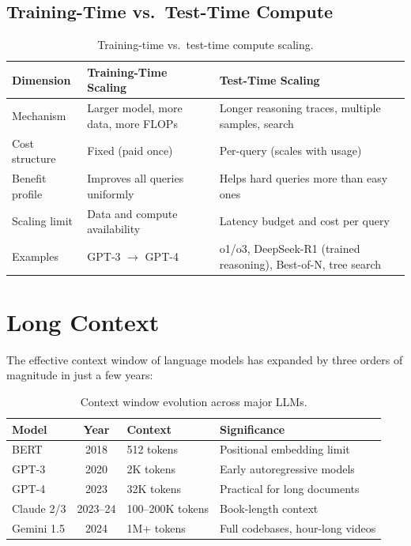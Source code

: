 \subsection{Training-Time vs.\ Test-Time Compute}

\begin{table}[H]
\centering
\small
\begin{tabularx}{\textwidth}{@{}l X X@{}}
\toprule
\textbf{Dimension} & \textbf{Training-Time Scaling}
& \textbf{Test-Time Scaling} \\
\midrule
Mechanism & Larger model, more data, more FLOPs
  & Longer reasoning traces, multiple samples, search \\
Cost structure & Fixed (paid once) & Per-query (scales with usage) \\
Benefit profile & Improves all queries uniformly
  & Helps hard queries more than easy ones \\
Scaling limit & Data and compute availability
  & Latency budget and cost per query \\
Examples & GPT-3 $\to$ GPT-4 & o1/o3, DeepSeek-R1 (trained reasoning),
  Best-of-N, tree search \\
\bottomrule
\end{tabularx}
\caption{Training-time vs.\ test-time compute scaling.}
\label{tab:train_test_compute}
\end{table}


\section{Long Context}
\label{sec:long_context}

The effective context window of language models has expanded by three orders
of magnitude in just a few years:

\begin{table}[H]
\centering
\small
\begin{tabularx}{\textwidth}{@{}l c l X@{}}
\toprule
\textbf{Model} & \textbf{Year} & \textbf{Context} & \textbf{Significance} \\
\midrule
BERT       & 2018 & 512 tokens   & Positional embedding limit \\
GPT-3      & 2020 & 2K tokens    & Early autoregressive models \\
GPT-4      & 2023 & 32K tokens   & Practical for long documents \\
Claude 2/3 & 2023--24 & 100--200K tokens & Book-length context \\
Gemini 1.5 & 2024 & 1M+ tokens   & Full codebases, hour-long videos \\
\bottomrule
\end{tabularx}
\caption{Context window evolution across major LLMs.}
\label{tab:context_evolution}
\end{table}

